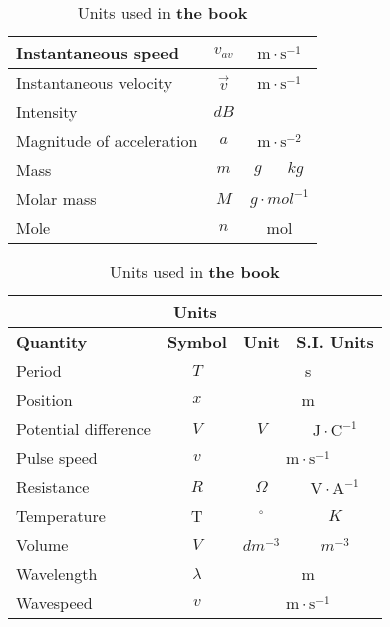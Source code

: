 \begin{table}[H]
\begin{center}
\begin{tabular}{|l|c|c|c|}
Instantaneous speed        & ${v}_{av}$      & \multicolumn{2}{c|}{$\text{m} \cdot \text{s}^{-1}$}  \\ \hline
Instantaneous velocity     & $\vec{v}$       & \multicolumn{2}{c|}{$\text{m} \cdot \text{s}^{-1}$}  \\ \hline
Intensity                  & $dB$            &                         &                            \\ \hline
Magnitude of acceleration  & $a$             & \multicolumn{2}{c|}{$\text{m} \cdot \text{s}^{-2}$}  \\ \hline
Mass                       & $m$             & $g$                     & $kg$                       \\ \hline
Molar mass                 & $M$             & \multicolumn{2}{c|}{$g \cdot mol^{-1}$}              \\ \hline
Mole                       & $n$             & \multicolumn{2}{c|}{mol}                             \\ \hline
\end{tabular}
\end{center}
\caption{Units used in \textbf{the book} }
\label{table:electricity::units}
\end{table}
\begin{table}[H]
\begin{center}
\begin{tabular}{|l|c|c|c|}\hline \hline 
\multicolumn{4}{|c|}{\textbf{Units}}\\ \hline \hline
\textbf{Quantity}          & \textbf{Symbol} & \textbf{Unit}           & \textbf{S.I. Units}        \\ \hline
Period                     & $T$             & \multicolumn{2}{c|}{s}                               \\ \hline
Position                   & $x$             & \multicolumn{2}{c|}{m}                               \\ \hline 
Potential difference       & $V$             & $V$                     & $\text{J}\cdot \text{C}^{-1}$ \\ \hline
Pulse speed                & $v$             & \multicolumn{2}{c|}{$\text{m} \cdot \text{s}^{-1}$}  \\ \hline
Resistance                 & $R$             & $\Omega$                & $\text{V} \cdot \text{A}^{-1}$ \\ \hline 
Temperature                & T               & $^{\circ}$              & $K$                        \\ \hline
Volume                     & $V$             & $dm^{-3}$               & $m^{-3}$                   \\ \hline
Wavelength                 & $\lambda$       & \multicolumn{2}{c|}{m}                               \\ \hline
Wavespeed                  & $v$             & \multicolumn{2}{c|}{$\text{m} \cdot \text{s}^{-1}$}  \\ \hline
\end{tabular}
\end{center}
\caption{Units used in \textbf{the book} }
\label{table:electricity::units}
\end{table}
